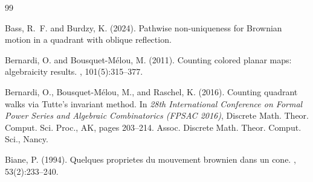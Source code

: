 \documentclass[11pt]{article}
\theoremstyle{definition}
\begin{document}
\begin{thebibliography}{99}

Bass, R.~F. and Burdzy, K. (2024).
\newblock Pathwise non-uniqueness for Brownian motion in a quadrant with
  oblique reflection.



Bernardi, O. and Bousquet-M\'elou, M. (2011).
\newblock Counting colored planar maps: algebraicity results.
, 101(5):315--377.

Bernardi, O., Bousquet-M\'elou, M., and Raschel, K. (2016).
\newblock Counting quadrant walks via {T}utte's invariant method.
\newblock In {\em 28th {I}nternational {C}onference on {F}ormal {P}ower
  {S}eries and {A}lgebraic {C}ombinatorics ({FPSAC} 2016)}, Discrete Math.
  Theor. Comput. Sci. Proc., AK, pages 203--214. Assoc. Discrete Math. Theor.
  Comput. Sci., Nancy.



Biane, P. (1994).
\newblock Quelques proprietes du mouvement brownien dans un cone.
, 53(2):233--240.



\end{thebibliography}
\end{document}
